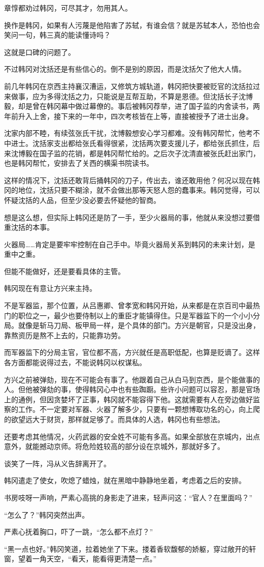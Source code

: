 章惇都劝过韩冈，可尽其才，勿用其人。

换作是韩冈，如果有人污蔑是他陷害了苏轼，有谁会信？就是苏轼本人，恐怕也会笑问一句，韩三真的能读懂诗吗？

这就是口碑的问题了。

不过韩冈对沈括还是有些信心的。倒不是别的原因，而是沈括欠了他大人情。

前几年韩冈在京西主持襄汉漕运，又修筑方城轨道，韩冈把快要被贬官的沈括拉过来做事，应为多得沈括之力，只能说是互帮互助，不算是恩德。但沈括长子沈博毅，却是曾在韩冈幕中做过幕僚的。事后被韩冈荐举，进了国子监的内舍读书，两年前升入上舍，接下来的一年中，四次考核皆在上等，直接被授予了进士出身。

沈家内部不睦，有续弦张氏干扰，沈博毅想安心学习都难。没有韩冈帮忙，他考不中进士。沈括家支出都给张氏看得很紧，沈括两次要支援儿子，都给张氏抓住，后来沈博毅在国子监的花销，都是韩冈帮忙给的。之后次子沈清直被张氏赶出家门，也是韩冈帮忙，安排去了关西的横渠书院读书。

这样的情况下，沈括还敢背后捅韩冈的刀子，传出去，谁还敢用他？何况以现在韩冈的地位，沈括只要不糊涂，就不会做出那等天怒人怨的蠢事来。韩冈觉得，可以怀疑沈括的人品，但至少没必要去怀疑他的智商。

想是这么想，但实际上韩冈还是防了一手，至少火器局的事，他就从来没想过要借重沈括的本事。

火器局……肯定是要牢牢控制在自己手中。毕竟火器局关系到韩冈的未来计划，是重中之重。

但能不能做好，还是要看具体的主管。

韩冈现在有意让方兴来主持。

不是军器监，那个位置，从吕惠卿、曾孝宽和韩冈开始，从来都是在京百司中最热门的职位之一，最少也要侍制以上的重臣才能镇得住。只是军器监下的一个小小分局。就像是斩马刀局、板甲局一样，是个具体的部门。方兴是朝官，只是没出身，靠熬资历是熬不上去的，只能靠功劳。

而军器监下的分局主官，官位都不高，方兴就任是高职低配，也算是贬谪了。这样各方面都能说得过去，不能说韩冈以权谋私。

方兴之前被弹劾，现在不可能会有事了。他跟着自己从白马到京西，是个能做事的人。但他被弹劾的事，使得韩冈心中也有些踟蹰。些许小问题可以容忍，那是官场上的通例，但因贪婪坏了正事，韩冈就不能容得下他。这就需要有人在旁边做好监察的工作。不一定要对军器、火器了解多少，只要有一颗想博取功名的心，向上爬的欲望远大于财货，那样就足够了。而具体的人选，韩冈也有些想法。

还要考虑其他情况，火药武器的安全姓不可能有多高。如果全部放在京城内，出点意外，就能撼动京师。将危险姓较高的部分设在京城外，那就好多了。

谈笑了一阵，冯从义告辞离开了。

韩冈遣走了使女，吹熄了蜡烛，就在黑暗中静静地坐着，考虑着之后的安排。

书房吱呀一声响，严素心高挑的身影走了进来，轻声问这：“官人？在里面吗？”

“怎么了？”韩冈突然出声。

严素心抚着胸口，吓了一跳，“怎么都不点灯？”

“黑一点也好。”韩冈笑道，拉着她坐了下来。搂着香软馥郁的娇躯，穿过敞开的轩窗，望着一角天空，“看天，能看得更清楚一点。”

